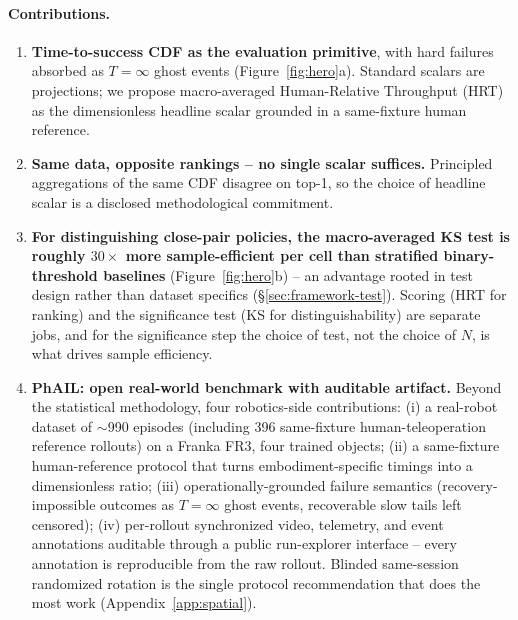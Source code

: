 \documentclass{article}
\begin{document}
\paragraph{Contributions.}

\begin{enumerate}[leftmargin=2em]
  \item \textbf{Time-to-success CDF as the evaluation primitive}, with hard failures absorbed as $T = \infty$ ghost events (Figure~\ref{fig:hero}a). Standard scalars are projections; we propose macro-averaged Human-Relative Throughput (HRT) as the dimensionless headline scalar grounded in a same-fixture human reference.
  \item \textbf{Same data, opposite rankings -- no single scalar suffices.} Principled aggregations of the same CDF disagree on top-1, so the choice of headline scalar is a disclosed methodological commitment.
  \item \textbf{For distinguishing close-pair policies, the macro-averaged KS test is roughly $30\times$ more sample-efficient per cell than stratified binary-threshold baselines} (Figure~\ref{fig:hero}b) -- an advantage rooted in test design rather than dataset specifics (\S\ref{sec:framework-test}). Scoring (HRT for ranking) and the significance test (KS for distinguishability) are separate jobs, and for the significance step the choice of test, not the choice of $N$, is what drives sample efficiency.
  \item \textbf{PhAIL: open real-world benchmark with auditable artifact.} Beyond the statistical methodology, four robotics-side contributions: (i) a real-robot dataset of $\sim$990 episodes (including 396 same-fixture human-teleoperation reference rollouts) on a Franka FR3, four trained objects; (ii) a same-fixture human-reference protocol that turns embodiment-specific timings into a dimensionless ratio; (iii) operationally-grounded failure semantics (recovery-impossible outcomes as $T{=}\infty$ ghost events, recoverable slow tails left censored); (iv) per-rollout synchronized video, telemetry, and event annotations auditable through a public run-explorer interface -- every annotation is reproducible from the raw rollout. Blinded same-session randomized rotation is the single protocol recommendation that does the most work (Appendix~\ref{app:spatial}).
\end{enumerate}
\end{document}
